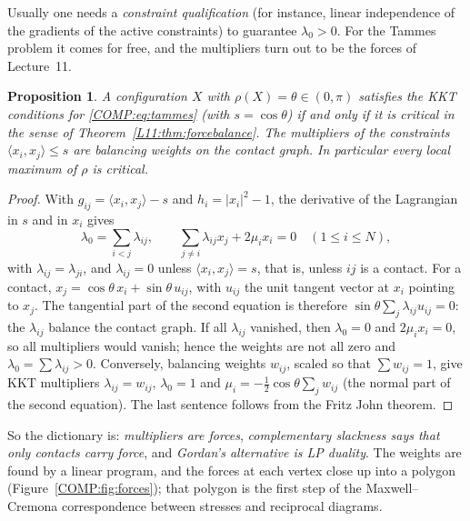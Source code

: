 \documentclass[11pt,openany]{book}
\theoremstyle{plain}
\newtheorem{proposition}[theorem]{Proposition}
\theoremstyle{definition}
\theoremstyle{remark}
\newcommand{\abs}[1]{\left\lvert #1 \right\rvert}
\newcommand{\ip}[2]{\langle #1, #2\rangle}
\begin{document}
Usually one needs a \emph{constraint qualification} (for instance, linear independence of the gradients of
the active constraints) to guarantee $\lambda_0>0$. For the Tammes problem it comes for free, and the
multipliers turn out to be the forces of Lecture~11.

\begin{proposition}\label{COMP:prop:kkt}
A configuration $X$ with $\rho(X)=\theta\in(0,\pi)$ satisfies the KKT conditions for
\eqref{COMP:eq:tammes} (with $s=\cos\theta$) if and only if it is critical in the sense of
Theorem~\ref{L11:thm:forcebalance}. The multipliers of the constraints $\ip{x_i}{x_j}\le s$ are balancing
weights on the contact graph. In particular every local maximum of $\rho$ is critical.
\end{proposition}

\begin{proof}
With $g_{ij}=\ip{x_i}{x_j}-s$ and $h_i=\abs{x_i}^2-1$, the derivative of the Lagrangian in $s$ and in $x_i$
gives
\[
  \lambda_0=\sum_{i<j}\lambda_{ij},\qquad \sum_{j\ne i}\lambda_{ij}x_j+2\mu_ix_i=0\quad(1\le i\le N),
\]
with $\lambda_{ij}=\lambda_{ji}$, and $\lambda_{ij}=0$ unless $\ip{x_i}{x_j}=s$, that is, unless $ij$ is a
contact. For a contact, $x_j=\cos\theta\,x_i+\sin\theta\,u_{ij}$, with $u_{ij}$ the unit tangent vector at
$x_i$ pointing to $x_j$. The tangential part of the second equation is therefore
$\sin\theta\sum_j\lambda_{ij}u_{ij}=0$: the $\lambda_{ij}$ balance the contact graph. If all
$\lambda_{ij}$ vanished, then $\lambda_0=0$ and $2\mu_ix_i=0$, so all multipliers would vanish; hence the
weights are not all zero and $\lambda_0=\sum\lambda_{ij}>0$. Conversely, balancing weights $w_{ij}$, scaled
so that $\sum w_{ij}=1$, give KKT multipliers $\lambda_{ij}=w_{ij}$, $\lambda_0=1$ and
$\mu_i=-\frac12\cos\theta\sum_jw_{ij}$ (the normal part of the second equation). The last sentence follows
from the Fritz John theorem.
\end{proof}

So the dictionary is: \emph{multipliers are forces}, \emph{complementary slackness says that only contacts
carry force}, and \emph{Gordan's alternative is LP duality}. The weights are found by a linear program,
and the forces at each vertex close up into a polygon (Figure~\ref{COMP:fig:forces}); that polygon is the
first step of the Maxwell--Cremona correspondence between stresses and reciprocal diagrams.
\end{document}
